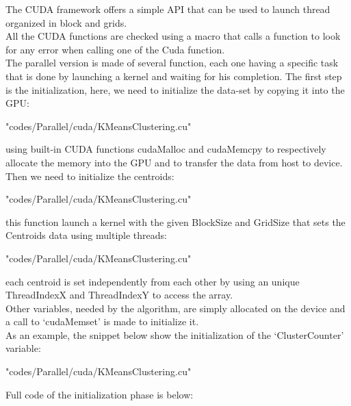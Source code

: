 \documentclass[10pt,twocolumn,letterpaper]{article}
\begin{document}
The CUDA framework offers a simple API that can be used to launch thread organized in block and grids.\\
All the CUDA functions are checked using a macro that calls a function to look for any error when calling one of the Cuda function.\\
The parallel version is made of several function, each one having a specific task that is done by launching a kernel and waiting for his
completion.
The first step is the initialization, here, we need to initialize the data-set by copying it into the GPU:\\
\begin{lstinputlisting}[language=C,style=CSnippetStyle,caption=CUDA Data-Set Initialization,firstline=245,lastline=256]{
	"codes/Parallel/cuda/KMeansClustering.cu"}
\end{lstinputlisting}
using built-in CUDA functions cudaMalloc and cudaMemcpy to respectively allocate the memory into the GPU and to transfer the data from
host to device.\\
Then we need to initialize the centroids:\\
\begin{lstinputlisting}[language=C,style=CSnippetStyle,caption=CUDA Centroids Initialization,firstline=185,lastline=204]{
	"codes/Parallel/cuda/KMeansClustering.cu"}
\end{lstinputlisting}
this function launch a kernel with the given BlockSize and GridSize that sets the Centroids data using multiple threads:
\begin{lstinputlisting}[language=C,style=CSnippetStyle,caption=CUDA Centroids Initialization,firstline=104,lastline=113]{
	"codes/Parallel/cuda/KMeansClustering.cu"}
\end{lstinputlisting}
each centroid is set independently from each other by using an unique ThreadIndexX and ThreadIndexY to access the array.\\
Other variables, needed by the algorithm, are simply allocated on the device and a call to `cudaMemset' is made to initialize it.\\
As an example, the snippet below show the initialization of the `ClusterCounter' variable:\\
\begin{lstinputlisting}[language=C,style=CSnippetStyle,caption=CUDA Example Initialization,firstline=206,lastline=218]{
	"codes/Parallel/cuda/KMeansClustering.cu"}
\end{lstinputlisting}
Full code of the initialization phase is below:\\
\end{document}
